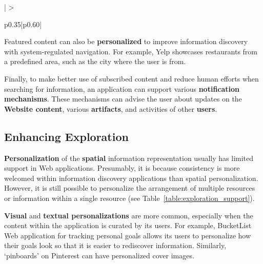 {{\begin{table}[ht!]
\begin{tabular}{{| >{\raggedright}p{0.35\linewidth}|p{0.60\linewidth}|}}
\end{tabular}
\end{table}
\clearpage

Featured content can also be \textbf{personalized} to improve information discovery with system-regulated navigation. For example, Yelp showcases restaurants from a predefined area, such as the city where the user is from.

Finally, to make better use of subscribed content and reduce human efforts when searching for information, an application can support various \textbf{notification mechanisms}. These mechanisms can advise the user about updates on the \textbf{Website content}, various \textbf{artifacts}, and activities of other \textbf{users}.  

} %
{\subsection{Enhancing Exploration}
\textbf{Personalization} of the \textbf{spatial} information representation usually has limited support in Web applications. Presumably, it is because consistency is more welcomed within information discovery applications than spatial personalization. However, it is still possible to personalize the arrangement of multiple resources or information within a single resource (see Table~\ref{table:exploration_support}). 

\textbf{Visual} and \textbf{textual personalizations} are more common, especially when the content within the application is curated by its users.  For example, BucketList Web application for tracking personal goals allows its users to personalize how their goals look so that it is easier to rediscover information. Similarly, `pinboards' on Pinterest can have personalized cover images.

}}

